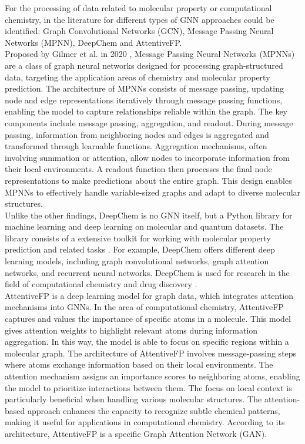 For the processing of data related to molecular property or computational chemistry, in the literature for different types of GNN approaches could be identified: Graph Convolutional Networks (GCN), Message Passing Neural Networks (MPNN), DeepChem and AttentiveFP. \\

Proposed by Gilmer et al. in 2020 \cite{gilmer_neural_2017}, Message Passing Neural Networks (MPNNs) are a class of graph neural networks designed for processing graph-structured data, targeting the application areas of chemistry and molecular property prediction. The architecture of MPNNs consists of message passing, updating node and edge representations iteratively through message passing functions, enabling the model to capture relationships reliable within the graph. The key components include message passing, aggregation, and readout. During message passing, information from neighboring nodes and edges is aggregated and transformed through learnable functions. Aggregation mechanisms, often involving summation or attention, allow nodes to incorporate information from their local environments. A readout function then processes the final node representations to make predictions about the entire graph. This design enables MPNNs to effectively handle variable-sized graphs and adapt to diverse molecular structures. \\

Unlike the other findings, DeepChem is no GNN itself, but a Python library for machine learning and deep learning on molecular and quantum datasets. The library consists of a extensive toolkit for working with molecular property prediction and related tasks \cite{noauthor_deepchem_nodate}. For example, DeepChem offers different deep learning models, including graph convolutional networks, graph attention networks, and recurrent neural networks. DeepChem is used for research in the field of computational chemistry and drug discovery \cite{altae-tran_low_2017}. \\

AttentiveFP is a deep learning model for graph data, which integrates attention mechanisms into GNNs.  In the area of computational chemistry, AttentiveFP captures and values the importance of specific atoms in a molecule. This model gives attention weights to highlight relevant atoms during information aggregation. In this way, the model is able to focus on specific regions within a molecular graph. The architecture of AttentiveFP involves message-passing steps where atoms exchange information based on their local environments. The attention mechanism assigns an importance scores to neighboring atoms, enabling the model to prioritize interactions between them. The focus on local context is particularly beneficial when handling various molecular structures. The attention-based approach enhances the capacity to recognize subtle chemical patterns, making it useful for applications in computational chemistry. According to its architecture, AttentiveFP is a specific Graph Attention Network (GAN). \cite{xiong_pushing_2019,jiang_could_2021} \\


